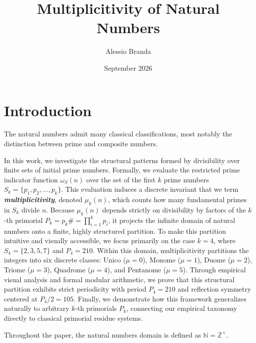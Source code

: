 \documentclass{article}
\title{Multiplicitivity of Natural Numbers}
\author{Alessio Branda}
\date{September 2026}
\begin{document}
\maketitle

\section{Introduction}
The natural numbers admit many classical classifications, most notably the distinction between prime and composite numbers.

In this work, we investigate the structural patterns formed by divisibility over finite sets of initial prime numbers. Formally, we evaluate the restricted prime indicator function $\omega_S(n)$ \cite{hardyramanujan1917} over the set of the first $k$ prime numbers $S_k = \{p_1, p_2, \dots, p_k\}$. This evaluation induces a discrete invariant that we term \textit{\textbf{multiplicitivity}}, denoted $\mu_k(n)$, which counts how many fundamental primes in $S_k$ divide $n$. Because $\mu_k(n)$ depends strictly on divisibility by factors of the $k$-th primorial $P_k = p_k\# = \prod_{i=1}^k p_i$, it projects the infinite domain of natural numbers onto a finite, highly structured partition. To make this partition intuitive and visually accessible, we focus primarily on the case $k=4$, where $S_4 = \{2, 3, 5, 7\}$ and $P_4 = 210$. Within this domain, multiplicitivity partitions the integers into six discrete classes: Unico ($\mu=0$), Monome ($\mu=1$), Duome ($\mu=2$), Triome ($\mu=3$), Quadrome ($\mu=4$), and Pentanome ($\mu=5$). Through empirical visual analysis and formal modular arithmetic, we prove that this structural partition exhibits strict periodicity with period $P_4 = 210$ and reflection symmetry centered at $P_4/2 = 105$. Finally, we demonstrate how this framework generalizes naturally to arbitrary $k$-th primorials $P_k$, connecting our empirical taxonomy directly to classical primorial residue systems.

Throughout the paper, the natural numbers domain is defined as $\mathbb{N}=\mathbb{Z^+}$.
\end{document}
